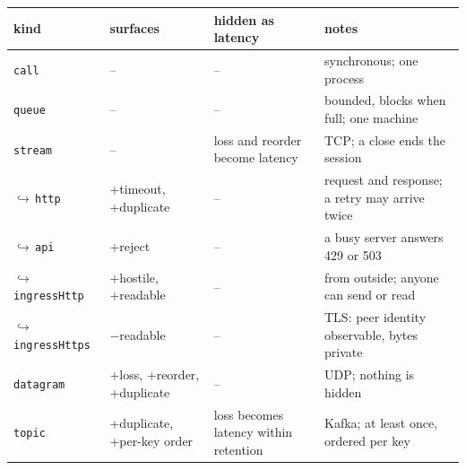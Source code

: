 \begin{tabular}{@{}p{}p{}p{}p{}@{}}
\toprule
kind & surfaces & hidden as latency & notes \\
\midrule
\texttt{call} & -- & -- & synchronous; one process \\
\texttt{queue} & -- & -- & bounded, blocks when full; one machine \\
\texttt{stream} & -- & loss and reorder become latency & TCP; a close ends the session \\
\hspace*{0.900000em}$\hookrightarrow$\,\texttt{http} & +timeout, +duplicate & -- & request and response; a retry may arrive twice \\
\hspace*{1.800000em}$\hookrightarrow$\,\texttt{api} & +reject & -- & a busy server answers 429 or 503 \\
\hspace*{1.800000em}$\hookrightarrow$\,\texttt{ingressHttp} & +hostile, +readable & -- & from outside; anyone can send or read \\
\hspace*{2.700000em}$\hookrightarrow$\,\texttt{ingressHttps} & $-$readable & -- & TLS: peer identity observable, bytes private \\
\texttt{datagram} & +loss, +reorder, +duplicate & -- & UDP; nothing is hidden \\
\texttt{topic} & +duplicate, +per-key order & loss becomes latency within retention & Kafka; at least once, ordered per key \\
\bottomrule
\end{tabular}
